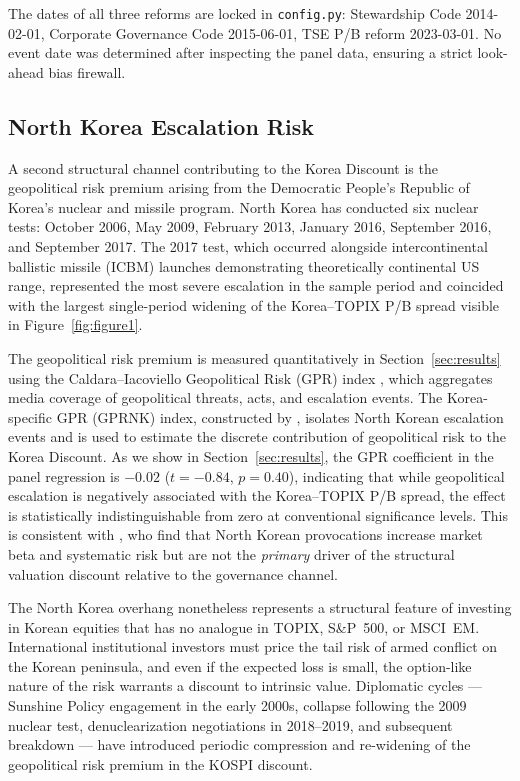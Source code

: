 \documentclass[12pt]{article}
\begin{document}
The dates of all three reforms are locked in \texttt{config.py}: Stewardship Code
2014-02-01, Corporate Governance Code 2015-06-01, TSE P/B reform 2023-03-01. No event
date was determined after inspecting the panel data, ensuring a strict look-ahead bias
firewall.

\subsection{North Korea Escalation Risk}
\label{subsec:nk}

A second structural channel contributing to the Korea Discount is the geopolitical risk
premium arising from the Democratic People's Republic of Korea's nuclear and missile program.
North Korea has conducted six nuclear tests: October 2006, May 2009, February 2013,
January 2016, September 2016, and September 2017. The 2017 test, which occurred alongside
intercontinental ballistic missile (ICBM) launches demonstrating theoretically continental
US range, represented the most severe escalation in the sample period and coincided with
the largest single-period widening of the Korea--TOPIX P/B spread visible in
Figure~\ref{fig:figure1}.

The geopolitical risk premium is measured quantitatively in Section~\ref{sec:results}
using the Caldara--Iacoviello Geopolitical Risk (GPR) index \citep{caldara2022}, which
aggregates media coverage of geopolitical threats, acts, and escalation events. The
Korea-specific GPR (GPRNK) index, constructed by \citet{imf2021}, isolates North Korean
escalation events and is used to estimate the discrete contribution of geopolitical risk
to the Korea Discount. As we show in Section~\ref{sec:results}, the GPR coefficient in
the panel regression is $-0.02$ ($t = -0.84$, $p = 0.40$), indicating that while
geopolitical escalation is negatively associated with the Korea--TOPIX P/B spread, the
effect is statistically indistinguishable from zero at conventional significance levels.
This is consistent with \citet{imf2021}, who find that North Korean provocations increase
market beta and systematic risk but are not the \textit{primary} driver of the structural
valuation discount relative to the governance channel.

The North Korea overhang nonetheless represents a structural feature of investing in Korean
equities that has no analogue in TOPIX, S\&P~500, or MSCI~EM. International institutional
investors must price the tail risk of armed conflict on the Korean peninsula, and even if
the expected loss is small, the option-like nature of the risk warrants a discount to
intrinsic value. Diplomatic cycles --- Sunshine Policy engagement in the early 2000s,
collapse following the 2009 nuclear test, denuclearization negotiations in 2018--2019, and
subsequent breakdown --- have introduced periodic compression and re-widening of the
geopolitical risk premium in the KOSPI discount.
\end{document}
